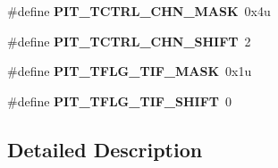 \begin{DoxyCompactItemize}
\item 
\#define {\bfseries P\+I\+T\+\_\+\+T\+C\+T\+R\+L\+\_\+\+C\+H\+N\+\_\+\+M\+A\+SK}~0x4u\hypertarget{group__PIT__Register__Masks_ga734e2e947c649d50b9ca46405e451c2b}{}\label{group__PIT__Register__Masks_ga734e2e947c649d50b9ca46405e451c2b}

\item 
\#define {\bfseries P\+I\+T\+\_\+\+T\+C\+T\+R\+L\+\_\+\+C\+H\+N\+\_\+\+S\+H\+I\+FT}~2\hypertarget{group__PIT__Register__Masks_ga9a1c8aa25a05c9b2c9503a003fa8d24d}{}\label{group__PIT__Register__Masks_ga9a1c8aa25a05c9b2c9503a003fa8d24d}

\item 
\#define {\bfseries P\+I\+T\+\_\+\+T\+F\+L\+G\+\_\+\+T\+I\+F\+\_\+\+M\+A\+SK}~0x1u\hypertarget{group__PIT__Register__Masks_ga9de8d708b43c9ca35df26c7b43f09769}{}\label{group__PIT__Register__Masks_ga9de8d708b43c9ca35df26c7b43f09769}

\item 
\#define {\bfseries P\+I\+T\+\_\+\+T\+F\+L\+G\+\_\+\+T\+I\+F\+\_\+\+S\+H\+I\+FT}~0\hypertarget{group__PIT__Register__Masks_gaf6f5ddca2193ed04bc61bc3e899f5ced}{}\label{group__PIT__Register__Masks_gaf6f5ddca2193ed04bc61bc3e899f5ced}

\end{DoxyCompactItemize}


\subsection{Detailed Description}
